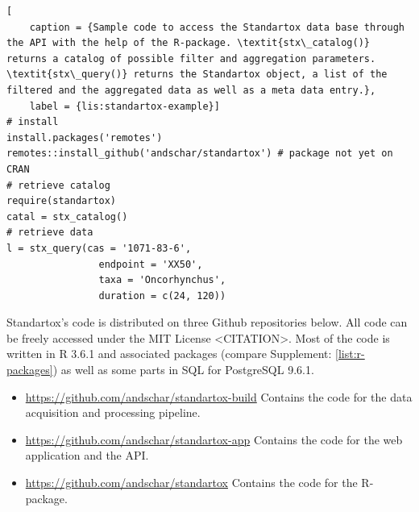 \documentclass[journal,datadescriptor,accept,moreauthors,pdftex]{Definitions/mdpi}
\begin{document}
\begin{lstlisting}[
    caption = {Sample code to access the Standartox data base through the API with the help of the R-package. \textit{stx\_catalog()} returns a catalog of possible filter and aggregation parameters. \textit{stx\_query()} returns the Standartox object, a list of the filtered and the aggregated data as well as a meta data entry.},
    label = {lis:standartox-example}]
# install
install.packages('remotes')
remotes::install_github('andschar/standartox') # package not yet on CRAN
# retrieve catalog    
require(standartox)
catal = stx_catalog()
# retrieve data
l = stx_query(cas = '1071-83-6',
                endpoint = 'XX50',
                taxa = 'Oncorhynchus',
                duration = c(24, 120))
\end{lstlisting}

Standartox's code is distributed on three Github repositories below. All code can be freely accessed under the MIT License <CITATION>. Most of the code is written in R 3.6.1 and associated packages (compare Supplement: \ref{list:r-packages}) as well as some parts in SQL for PostgreSQL 9.6.1.

\begin{itemize}

\item \url{https://github.com/andschar/standartox-build} \newline
Contains the code for the data acquisition and processing pipeline.

\item \url{https://github.com/andschar/standartox-app} \newline
Contains the code for the web application and the API.

\item \url{https://github.com/andschar/standartox} \newline
Contains the code for the R-package.

\end{itemize}

\end{document}
